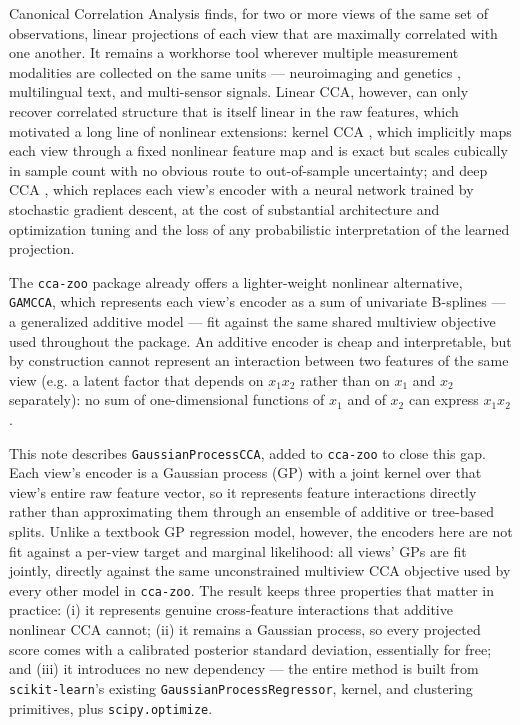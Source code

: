 \documentclass[11pt]{article}
\begin{document}
Canonical Correlation Analysis \citep{hotelling1936relations} finds, for two or more views of the same set of observations, linear projections of each view that are maximally correlated with one another. It remains a workhorse tool wherever multiple measurement modalities are collected on the same units --- neuroimaging and genetics \citep{bach2005probabilistic,klami2013bayesian}, multilingual text, and multi-sensor signals. Linear CCA, however, can only recover correlated structure that is itself linear in the raw features, which motivated a long line of nonlinear extensions: kernel CCA \citep{hardoon2004canonical}, which implicitly maps each view through a fixed nonlinear feature map and is exact but scales cubically in sample count with no obvious route to out-of-sample uncertainty; and deep CCA \citep{andrew2013deep,wang2015deep}, which replaces each view's encoder with a neural network trained by stochastic gradient descent, at the cost of substantial architecture and optimization tuning and the loss of any probabilistic interpretation of the learned projection.

The \texttt{cca-zoo} package \citep{chapman2021cca} already offers a lighter-weight nonlinear alternative, \texttt{GAMCCA}, which represents each view's encoder as a sum of univariate B-splines --- a generalized additive model \citep{hastie1999generalized} --- fit against the same shared multiview objective used throughout the package. An additive encoder is cheap and interpretable, but by construction cannot represent an interaction between two features of the same view (e.g. a latent factor that depends on $x_1 x_2$ rather than on $x_1$ and $x_2$ separately): no sum of one-dimensional functions of $x_1$ and of $x_2$ can express $x_1 x_2$.

This note describes \texttt{GaussianProcessCCA}, added to \texttt{cca-zoo} to close this gap. Each view's encoder is a Gaussian process (GP) with a joint kernel over that view's entire raw feature vector, so it represents feature interactions directly rather than approximating them through an ensemble of additive or tree-based splits. Unlike a textbook GP regression model, however, the encoders here are not fit against a per-view target and marginal likelihood: all views' GPs are fit jointly, directly against the same unconstrained multiview CCA objective used by every other model in \texttt{cca-zoo}. The result keeps three properties that matter in practice: (i) it represents genuine cross-feature interactions that additive nonlinear CCA cannot; (ii) it remains a Gaussian process, so every projected score comes with a calibrated posterior standard deviation, essentially for free; and (iii) it introduces no new dependency --- the entire method is built from \texttt{scikit-learn}'s existing \texttt{GaussianProcessRegressor}, kernel, and clustering primitives, plus \texttt{scipy.optimize}.
\end{document}
